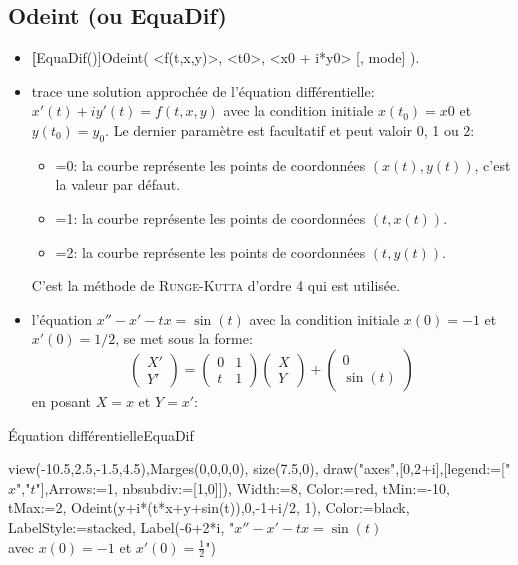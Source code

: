 \subsection{Odeint (ou EquaDif)}\label{cmdEquadif}
\begin{itemize}
 \item \util \textbf[EquaDif()]{Odeint( <f(t,x,y)>, <t0>, <x0 + i*y0> [, mode] )}.
 \item \desc trace une solution approchée de l'équation différentielle: $x'(t)+iy'(t)=f(t,x,y)$ avec la condition initiale $x(t_0)=x0$ et $y(t_0)=y_0$. Le dernier paramètre est facultatif et peut valoir 0, 1 ou 2:
  \begin{itemize}
  \item {}=0: la courbe représente les points de coordonnées $(x(t),y(t))$, c'est la valeur par défaut.
  \item {}=1: la courbe représente les points de coordonnées $(t,x(t))$.
  \item {}=2: la courbe représente les points de coordonnées $(t,y(t))$.
  \end{itemize}
C'est la méthode de \textsc{Runge-Kutta} d'ordre 4 qui est utilisée.
 \item \exem l'équation $x''-x'-tx=\sin(t)$ avec la condition initiale $x(0)=-1$ et $x'(0)=1/2$, se met sous la forme:
\[\begin{pmatrix}
X'\\Y'\end{pmatrix}=\begin{pmatrix} 0&1\\t&1\end{pmatrix}\begin{pmatrix}X\\Y\end{pmatrix}+
\begin{pmatrix}0\\\sin(t)\end{pmatrix}\] en posant $X=x$ et $Y=x'$:
\end{itemize}

\begin{demo}{\'Equation différentielle}{EquaDif}
\begin{texgraph}[name=EquaDif]
view(-10.5,2.5,-1.5,4.5),Marges(0,0,0,0), size(7.5,0),
draw("axes",[0,2+i],[legend:=["$x$","$t$"],Arrows:=1,
 nbsubdiv:=[1,0]]),
Width:=8, Color:=red, tMin:=-10, tMax:=2,
Odeint(y+i*(t*x+y+sin(t)),0,-1+i/2, 1),
Color:=black, LabelStyle:=stacked,
Label(-6+2*i,
 "$x''-x'-tx=\sin(t)$\\avec $x(0)=-1$ et $x'(0)=\frac12$")
\end{texgraph}
\end{demo}


